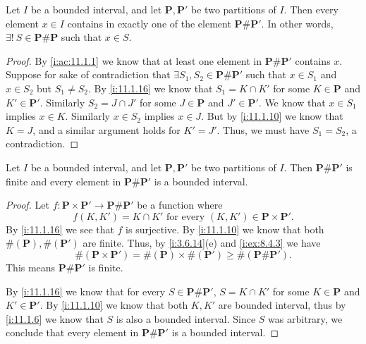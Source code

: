 \begin{ac}\label{i:ac:11.1.2}
  Let \(I\) be a bounded interval, and let \(\mathbf{P}, \mathbf{P}'\) be two partitions of \(I\).
  Then every element \(x \in I\) contains in exactly one of the element \(\mathbf{P} \# \mathbf{P}'\).
  In other words, \(\exists!\ S \in \mathbf{P} \# \mathbf{P}\) such that \(x \in S\).
\end{ac}

\begin{proof}
  By \cref{i:ac:11.1.1} we know that at least one element in \(\mathbf{P} \# \mathbf{P}'\) contains \(x\).
  Suppose for sake of contradiction that \(\exists S_1, S_2 \in \mathbf{P} \# \mathbf{P}'\) such that \(x \in S_1\) and \(x \in S_2\) but \(S_1 \neq S_2\).
  By \cref{i:11.1.16} we know that \(S_1 = K \cap K'\) for some \(K \in \mathbf{P}\) and \(K' \in \mathbf{P}'\).
  Similarly \(S_2 = J \cap J'\) for some \(J \in \mathbf{P}\) and \(J' \in \mathbf{P}'\).
  We know that \(x \in S_1\) implies \(x \in K\).
  Similarly \(x \in S_2\) implies \(x \in J\).
  But by \cref{i:11.1.10} we know that \(K = J\), and a similar argument holds for \(K' = J'\).
  Thus, we must have \(S_1 = S_2\), a contradiction.
\end{proof}

\begin{ac}\label{i:ac:11.1.3}
  Let \(I\) be a bounded interval, and let \(\mathbf{P}, \mathbf{P}'\) be two partitions of \(I\).
  Then \(\mathbf{P} \# \mathbf{P}'\) is finite and every element in \(\mathbf{P} \# \mathbf{P}'\) is a bounded interval.
\end{ac}

\begin{proof}
  Let \(f : \mathbf{P} \times \mathbf{P}' \to \mathbf{P} \# \mathbf{P}'\) be a function where
  \[
    f(K, K') = K \cap K' \text{ for every } (K, K') \in \mathbf{P} \times \mathbf{P}'.
  \]
  By \cref{i:11.1.16} we see that \(f\) is surjective.
  By \cref{i:11.1.10} we know that both \(\#(\mathbf{P}), \#(\mathbf{P}')\) are finite.
  Thus, by \cref{i:3.6.14}(e) and \cref{i:ex:8.4.3} we have
  \[
    \#(\mathbf{P} \times \mathbf{P}') = \#(\mathbf{P}) \times \#(\mathbf{P}') \geq \#(\mathbf{P} \# \mathbf{P}').
  \]
  This means \(\mathbf{P} \# \mathbf{P}'\) is finite.

  By \cref{i:11.1.16} we know that for every \(S \in \mathbf{P} \# \mathbf{P}'\), \(S = K \cap K'\) for some \(K \in \mathbf{P}\) and \(K' \in \mathbf{P}'\).
  By \cref{i:11.1.10} we know that both \(K, K'\) are bounded interval, thus by \cref{i:11.1.6} we know that \(S\) is also a bounded interval.
  Since \(S\) was arbitrary, we conclude that every element in \(\mathbf{P} \# \mathbf{P}'\) is a bounded interval.
\end{proof}

